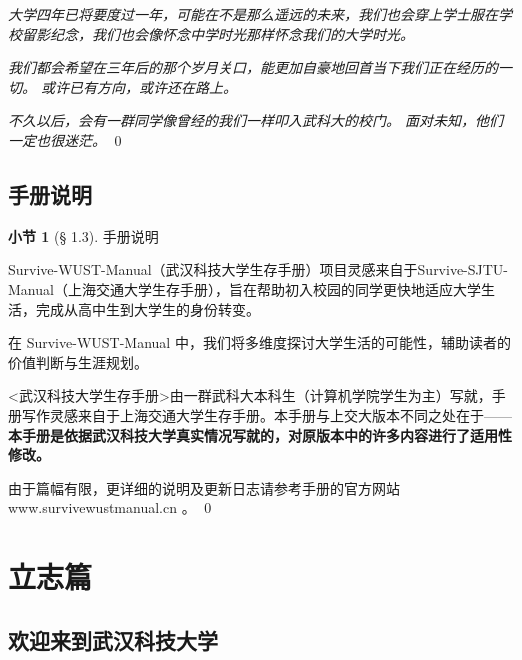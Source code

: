 \documentclass{beamer}	%
\theoremstyle{plain}
\theoremstyle{definition}
\newtheorem{dfn}{小节}[section]
\theoremstyle{remark}
\numberwithin{equation}{section}
\begin{document}
\begin{frame}
	\textit{大学四年已将要度过一年，可能在不是那么遥远的未来，我们也会穿上学士服在学校留影纪念，我们也会像怀念中学时光那样怀念我们的大学时光。}
	\vspace{0.5cm}

	\textit{我们都会希望在三年后的那个岁月关口，能更加自豪地回首当下我们正在经历的一切。
	或许已有方向，或许还在路上。}
	\vspace{0.5cm}

	\textit{不久以后，会有一群同学像曾经的我们一样叩入武科大的校门。
	面对未知，他们一定也很迷茫。}
	\qed
\end{frame}


\subsection{手册说明}
\begin{frame}
	\begin{dfn}[§ 1.3]
		手册说明
	\end{dfn}
\end{frame}

\begin{frame}
	Survive-WUST-Manual（武汉科技大学生存手册）项目灵感来自于Survive-SJTU-Manual（上海交通大学生存手册），旨在帮助初入校园的同学更快地适应大学生活，完成从高中生到大学生的身份转变。
	\vspace{0.5cm}

	在 Survive-WUST-Manual 中，我们将多维度探讨大学生活的可能性，辅助读者的价值判断与生涯规划。
	\vspace{0.5cm}

	<武汉科技大学生存手册>由一群武科大本科生（计算机学院学生为主）写就，手册写作灵感来自于上海交通大学生存手册。本手册与上交大版本不同之处在于——\textbf{本手册是依据武汉科技大学真实情况写就的，对原版本中的许多内容进行了适用性修改。}
	\vspace{0.5cm}

	由于篇幅有限，更详细的说明及更新日志请参考手册的官方网站
	\vspace{0.1cm}
	www.survivewustmanual.cn 。
	\qed
\end{frame}

\section{立志篇}
\subsection{欢迎来到武汉科技大学}
\end{document}
